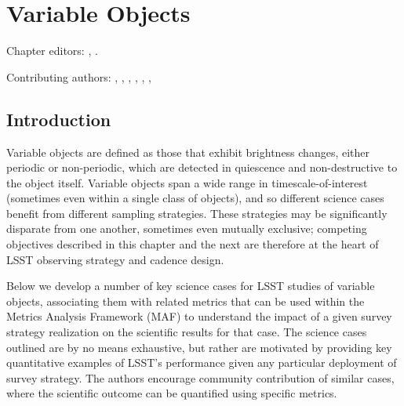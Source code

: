 
\chapter[Variable Objects]{Variable Objects}
\def\chpname{variables}\label{chp:\chpname}

Chapter editors:
,
.

Contributing authors:
,
,
,
,
,
,

%



\section{Introduction}

Variable objects are defined as those that exhibit brightness changes,
either periodic or non-periodic, which are detected in quiescence and
non-destructive to the object itself. Variable objects span a wide range
in timescale-of-interest (sometimes even within a single class of
objects), and so different science cases benefit from different sampling
strategies. These strategies may be significantly disparate from one
another, sometimes even mutually exclusive; competing objectives
described in this chapter and the next are therefore at the heart of
LSST observing strategy and cadence design.

Below we develop a number of key science cases for LSST studies of
variable objects, associating them with related metrics that can be used
within the Metrics Analysis Framework (MAF) to understand the impact of
a given survey strategy realization on the scientific results for that
case. The science cases outlined are by no means exhaustive, but rather
are motivated by providing key quantitative examples of LSST's
performance given any particular deployment of survey strategy. The
authors encourage community contribution of similar cases, where the
scientific outcome can be quantified using specific metrics.



